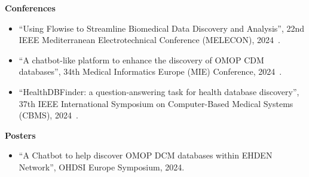 \noindent \textbf{Conferences}

\begin{itemize}
    \item ``Using Flowise to Streamline Biomedical Data Discovery and Analysis'', 22nd IEEE Mediterranean Electrotechnical Conference (MELECON), 2024~\cite{reis2024flowise}.
    \item ``A chatbot-like platform to enhance the discovery of OMOP CDM databases'', 34th Medical Informatics Europe (MIE) Conference, 2024~\cite{reis2024chatbotlike}.
    \item ``HealthDBFinder: a question-answering task for health database discovery'', 37th IEEE International Symposium on Computer-Based Medical Systems (CBMS), 2024~\cite{almeida2024healthdbfinder}.
\end{itemize}


\noindent \textbf{Posters}

\begin{itemize}
    \item ``A Chatbot to help discover OMOP DCM databases within EHDEN Network'', OHDSI Europe Symposium, 2024.
\end{itemize}
